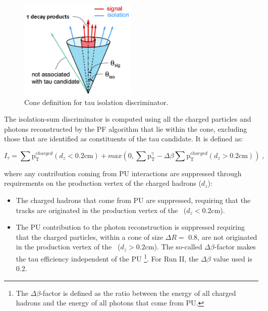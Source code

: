\begin{figure}[ht]
  \begin{center}
    \includegraphics[width=0.5\textwidth]{figuras/Chapter3/taucone}
    \caption{Cone definition for tau  isolation discriminator.}
    \label{fig:taucone}
  \end{center}
\end{figure} 

\noindent The isolation-sum discriminator is computed using all the 
charged particles and photons reconstructed by the PF algorithm that lie 
within the cone, excluding those that are identified
as constituents of the tau candidate. It is defined as:

\begin{equation} \label{eq:TauIso}
I_{\tau} = \sum \textrm{p}_{\textrm{T}}^{charged} (d_{z} < 0.2 \textrm{cm}) + 
max\left(0, \sum \textrm{p}_{\textrm{T}}^{\gamma}- \Delta\beta \sum \textrm{p}_{\textrm{T}}^{charged} (d_{z} > 0.2 \textrm{cm}) \right) \; ,
\end{equation}

\noindent where any contribution coming from PU interactions are suppressed through 
requirements on the production vertex of the charged hadrons ($d_{z}$): 

\begin{itemize}
 \item The charged hadrons that come from PU are suppressed, requiring that the tracks are originated 
 in the production vertex of the \tauh~($d_{z} < 0.2 \textrm{cm}$).
 \item The PU contribution to the photon reconstruction is suppressed requiring that the charged 
 particles, within a cone of size $\Delta R =$ 0.8, are not originated in the 
 production vertex  of the \tauh~($d_{z} > 0.2 \textrm{cm}$). The so-called 
 $\Delta \beta$-factor makes the tau efficiency independent of the PU \footnote{
 The $\Delta \beta$-factor is defined as the ratio between the energy of all 
 charged hadrons and the energy of all photons that come from PU.}. For Run II, the  $\Delta \beta$ value used is 0.2.
\end{itemize}

